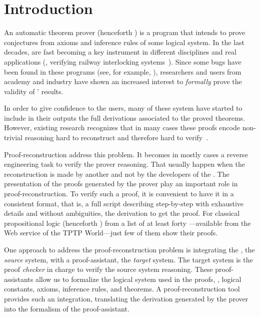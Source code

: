 \documentclass[../main.tex]{subfiles}
\begin{document}

\section{Introduction}
\label{sec:introduction}

An automatic theorem prover (henceforth \ATP) is a program that
intends to prove conjectures from axioms and inference rules of some
logical system. In the last decades, \ATPs are fast becoming a key
instrument in different disciplines and real applications (\eg,
verifying railway interlocking systems~\cite{Kanso2012}). Since some
bugs have been found in these programs (see, for example,
\cite{Keller2013,Bohme2011,Fleury2014}), researchers and users from
academy and industry have shown an increased interest to
\emph{formally} prove the validity of \ATPs' results.

In order to give confidence to the \ATP users, many of these system
have started to include in their outputs the full derivations
associated to the proved theorems. However, existing research
recognizes that in many cases these proofs encode non-trivial
reasoning hard to reconstruct and therefore hard to
verify~\cite{paulson2007source,Keller2013}.

Proof-reconstruction address this problem. It becomes in mostly cases
a reverse engineering task to verify the prover reasoning. That
usually happen when the reconstruction is made by another and not by
the developers of the \ATP. The presentation of the proofs generated
by the prover play an important role in proof-reconstruction. To
verify such a proof, it is convenient to have it in a consistent
format, that is, a full script describing step-by-step with exhaustive
details and without ambiguities, the derivation to get the proof. For
classical propositional logic (henceforth \CPL) from a list of at
least forty \ATPs---available from the Web service 
of the TPTP World---just few of them show their proofs.

One approach to address the proof-reconstruction problem is
integrating the \ATP, the \emph{source} system, with a
proof-assistant, the \emph{target} system. The target system is the
proof \emph{checker} in charge to verify the source system reasoning.
These proof-assistants allow us to formalize the logical system used
in the proofs, \ie, logical constants, axioms, inference rules, and
theorems. A proof-reconstruction tool provides such an integration,
translating the derivation generated by the prover into the formalism
of the proof-assistant.
\end{document}
